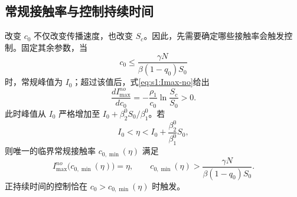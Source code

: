 \subsection{常规接触率与控制持续时间}
改变 $c_0$ 不仅改变传播速度，也改变 $S_c$。因此，先需要确定哪些接触率会触发控制。固定其余参数，当
\[
c_0\le\frac{\gamma N}{\beta(1-q_0)S_0}
\]
时，常规峰值为 $I_0$；超过该值后，式\eqref{eq:s1:Imax-no}给出
\begin{equation}
\frac{dI_{\max}^{no}}{dc_0}
=-\frac{\rho_1}{c_0}\ln\frac{S_c}{S_0}>0.
\label{eq:s1:Imax-no-c0-derivative}
\end{equation}
此时峰值从 $I_0$ 严格增加至 $I_0+\beta_2^0 S_0/\beta_1^0$。若
\[
I_0<\eta<I_0+\frac{\beta_2^0}{\beta_1^0}S_0,
\]
则唯一的临界常规接触率 $c_{0,\min}(\eta)$ 满足
\begin{equation}
I_{\max}^{no}\bigl(c_{0,\min}(\eta)\bigr)=\eta,
\qquad c_{0,\min}(\eta)>\frac{\gamma N}{\beta(1-q_0)S_0}.
\label{eq:s1:c0-min-def}
\end{equation}
正持续时间的控制恰在 $c_0>c_{0,\min}(\eta)$ 时触发。

